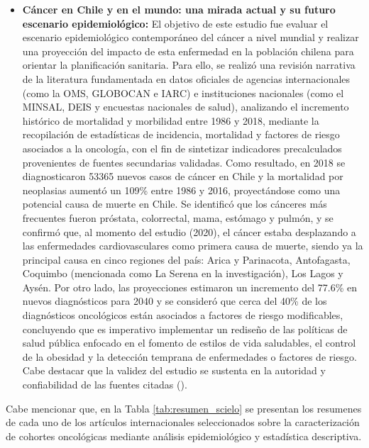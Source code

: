 \begin{itemize}
\item \textbf{Cáncer en Chile y en el mundo: una mirada actual y su futuro escenario epidemiológico:} El objetivo de este estudio fue evaluar el escenario epidemiológico contemporáneo del cáncer a nivel mundial y realizar una proyección del impacto de esta enfermedad en la población chilena para orientar la planificación sanitaria. Para ello, se realizó una revisión narrativa de la literatura fundamentada en datos oficiales de agencias internacionales (como la OMS, GLOBOCAN e IARC) e instituciones nacionales (como el MINSAL, DEIS y encuestas nacionales de salud), analizando el incremento histórico de mortalidad y morbilidad entre 1986 y 2018, mediante la recopilación de estadísticas de incidencia, mortalidad y factores de riesgo asociados a la oncología, con el fin de sintetizar indicadores precalculados provenientes de fuentes secundarias validadas. Como resultado, en 2018 se diagnosticaron 53365 nuevos casos de cáncer en Chile y la mortalidad por neoplasias aumentó un 109\% entre 1986 y 2016, proyectándose como una potencial causa de muerte en Chile. Se identificó que los cánceres más frecuentes fueron próstata, colorrectal, mama, estómago y pulmón, y se confirmó que, al momento del estudio (2020), el cáncer estaba desplazando a las enfermedades cardiovasculares como primera causa de muerte, siendo ya la principal causa en cinco regiones del país: Arica y Parinacota, Antofagasta, Coquimbo (mencionada como La Serena en la investigación), Los Lagos y Aysén. Por otro lado, las proyecciones estimaron un incremento del 77.6\% en nuevos diagnósticos para 2040 y se consideró que cerca del 40\% de los diagnósticos oncológicos están asociados a factores de riesgo modificables, concluyendo que es imperativo implementar un rediseño de las políticas de salud pública enfocado en el fomento de estilos de vida saludables, el control de la obesidad y la detección temprana de enfermedades o factores de riesgo. Cabe destacar que la validez del estudio se sustenta en la autoridad y confiabilidad de las fuentes citadas (\cite{scielo4}).
\end{itemize}

Cabe mencionar que, en la Tabla \ref{tab:resumen_scielo} se presentan los resumenes de cada uno de los artículos internacionales seleccionados sobre la caracterización de cohortes oncológicas mediante análisis epidemiológico y estadística descriptiva.

